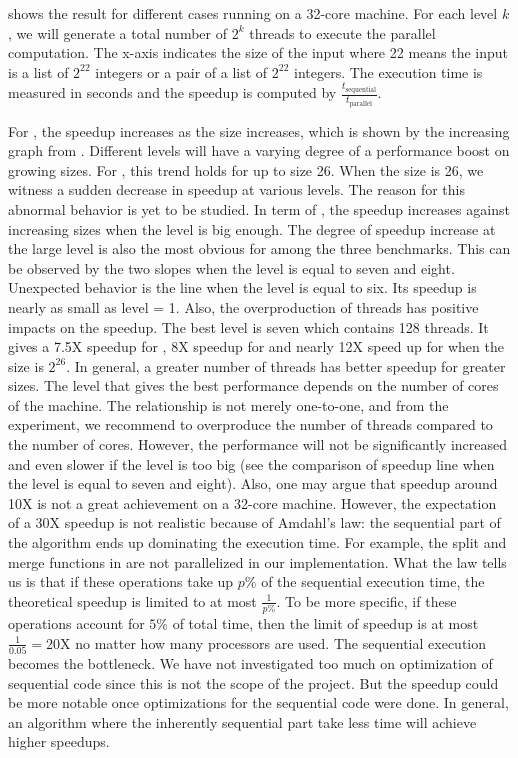  shows the result for different cases running on a 32-core machine. For each level $k$, we will generate a total number of $2^k$ threads to execute the parallel computation. The x-axis indicates the size of the input where 22 means the input is a list of $2^{22}$ integers or a pair of a list of $2^{22}$ integers. The execution time is measured in seconds and the speedup is computed by $\frac{t_{\text{sequential}}}{t_\text{parallel}}$. 

For , the speedup increases as the size increases, which is shown by the increasing graph from . Different levels will have a varying degree of a performance boost on growing sizes. For , this trend holds for up to size 26. When the size is 26, we witness a sudden decrease in speedup at various levels. The reason for this abnormal behavior is yet to be studied. In term of , the speedup increases against increasing sizes when the level is big enough. The degree of speedup increase at the large level is also the most obvious for  among the three benchmarks. This can be observed by the two slopes when the level is equal to seven and eight. Unexpected behavior is the line when the level is equal to six. Its speedup is nearly as small as level = 1. Also, the overproduction of threads has positive impacts on the speedup. The best level is seven which contains 128 threads. It gives a 7.5X speedup for , 8X speedup for  and nearly 12X speed up for  when the size is $2^{26}$. In general, a greater number of threads has better speedup for greater sizes. The level that gives the best performance depends on the number of cores of the machine. The relationship is not merely one-to-one, and from the experiment, we recommend to overproduce the number of threads compared to the number of cores. However, the performance will not be significantly increased and even slower if the level is too big (see the comparison of speedup line when the level is equal to seven and eight). Also, one may argue that speedup around 10X is not a great achievement on a 32-core machine. However, the expectation of a 30X speedup is not realistic because of Amdahl's law: the sequential part of the algorithm ends up dominating the execution time. For example, the split and merge functions in  are not parallelized in our implementation. What the law tells us is that if these operations take up $p\%$ of the sequential execution time, the theoretical speedup is limited to at most $\frac{1}{p\%}$. To be more specific, if these operations account for $5\%$ of total time, then the limit of speedup is at most $\frac{1}{0.05} = 20$X no matter how many processors are used. The sequential execution becomes the bottleneck. We have not investigated too much on optimization of sequential code since this is not the scope of the project. But the speedup could be more notable once optimizations for the sequential code were done. In general, an algorithm where the inherently sequential part take less time will achieve higher speedups.